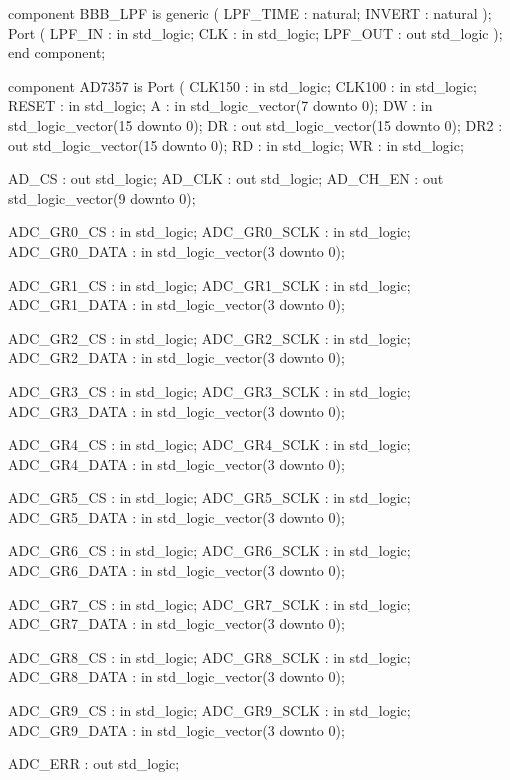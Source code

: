 \begin{mylisting}[language=VHDL,caption=トップモジュール,label=appF_Top_module_VHDL]
	component BBB_LPF is
		generic (
			LPF_TIME	: natural;
			INVERT		: natural
		);
		Port (
			LPF_IN	: in std_logic;
			CLK		: in std_logic;
			LPF_OUT	: out std_logic
		);
	end component;


	component AD7357 is
		Port (
			CLK150		: in	std_logic;
			CLK100		: in	std_logic;
			RESET		: in	std_logic;
			A			: in	std_logic_vector(7 downto 0);
			DW			: in	std_logic_vector(15 downto 0);
			DR			: out	std_logic_vector(15 downto 0);
			DR2			: out	std_logic_vector(15 downto 0);
			RD			: in	std_logic;
			WR			: in	std_logic;
			
			AD_CS		: out	std_logic;
			AD_CLK		: out	std_logic;
			AD_CH_EN	: out	std_logic_vector(9 downto 0);
			
			ADC_GR0_CS		: in	std_logic;
			ADC_GR0_SCLK	: in	std_logic;
			ADC_GR0_DATA	: in	std_logic_vector(3 downto 0);

			ADC_GR1_CS		: in	std_logic;
			ADC_GR1_SCLK	: in	std_logic;
			ADC_GR1_DATA	: in	std_logic_vector(3 downto 0);

			ADC_GR2_CS		: in	std_logic;
			ADC_GR2_SCLK	: in	std_logic;
			ADC_GR2_DATA	: in	std_logic_vector(3 downto 0);

			ADC_GR3_CS		: in	std_logic;
			ADC_GR3_SCLK	: in	std_logic;
			ADC_GR3_DATA	: in	std_logic_vector(3 downto 0);

			ADC_GR4_CS		: in	std_logic;
			ADC_GR4_SCLK	: in	std_logic;
			ADC_GR4_DATA	: in	std_logic_vector(3 downto 0);

			ADC_GR5_CS		: in	std_logic;
			ADC_GR5_SCLK	: in	std_logic;
			ADC_GR5_DATA	: in	std_logic_vector(3 downto 0);

			ADC_GR6_CS		: in	std_logic;
			ADC_GR6_SCLK	: in	std_logic;
			ADC_GR6_DATA	: in	std_logic_vector(3 downto 0);

			ADC_GR7_CS		: in	std_logic;
			ADC_GR7_SCLK	: in	std_logic;
			ADC_GR7_DATA	: in	std_logic_vector(3 downto 0);

			ADC_GR8_CS		: in	std_logic;
			ADC_GR8_SCLK	: in	std_logic;
			ADC_GR8_DATA	: in	std_logic_vector(3 downto 0);

			ADC_GR9_CS		: in	std_logic;
			ADC_GR9_SCLK	: in	std_logic;
			ADC_GR9_DATA	: in	std_logic_vector(3 downto 0);
			
			ADC_ERR			: out	std_logic;
			

\end{mylisting}
